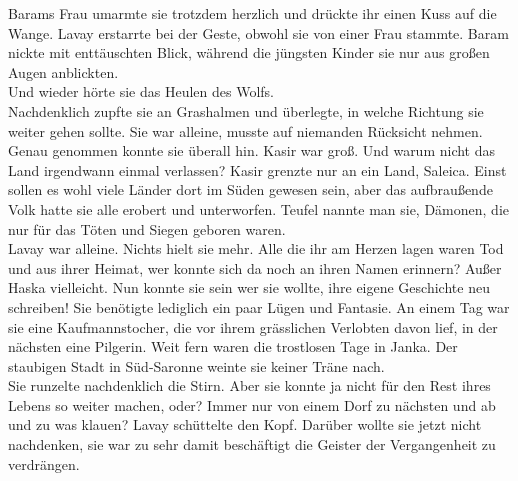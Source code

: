 Barams Frau umarmte sie trotzdem herzlich und drückte ihr einen Kuss auf die Wange. Lavay erstarrte 
bei der Geste, obwohl sie von einer Frau stammte. Baram nickte mit enttäuschten Blick, während die 
jüngsten Kinder sie nur aus großen Augen anblickten.\\
Und wieder hörte sie das Heulen des Wolfs.\\
Nachdenklich zupfte sie an Grashalmen und überlegte, in welche Richtung sie weiter gehen sollte. Sie 
war alleine, musste auf niemanden Rücksicht nehmen. Genau genommen konnte sie überall hin. Kasir 
war groß. Und warum nicht das Land irgendwann einmal verlassen? Kasir grenzte nur an ein Land, 
Saleica. Einst sollen es wohl viele Länder dort im Süden gewesen sein, aber das aufbraußende 
Volk hatte sie alle erobert und unterworfen. Teufel nannte man sie, Dämonen, die nur für das 
Töten und Siegen geboren waren.\\
Lavay war alleine. Nichts hielt sie mehr. Alle die ihr am Herzen lagen waren Tod und aus ihrer 
Heimat, wer konnte sich da noch an ihren Namen erinnern? Außer Haska vielleicht. Nun konnte sie 
sein wer sie wollte, ihre eigene Geschichte neu schreiben! Sie benötigte lediglich ein paar Lügen 
und Fantasie. An einem Tag war sie eine Kaufmannstocher, die vor ihrem grässlichen Verlobten davon 
lief, in der nächsten eine Pilgerin. Weit fern waren die trostlosen Tage in Janka. Der staubigen 
Stadt in Süd-Saronne weinte sie keiner Träne nach.\\
Sie runzelte nachdenklich die Stirn. Aber sie konnte ja nicht für den Rest ihres Lebens so weiter 
machen, oder? Immer nur von einem Dorf zu nächsten und ab und zu was klauen? Lavay schüttelte den 
Kopf. Darüber wollte sie jetzt nicht nachdenken, sie war zu sehr damit beschäftigt die Geister der 
Vergangenheit zu verdrängen.\\

